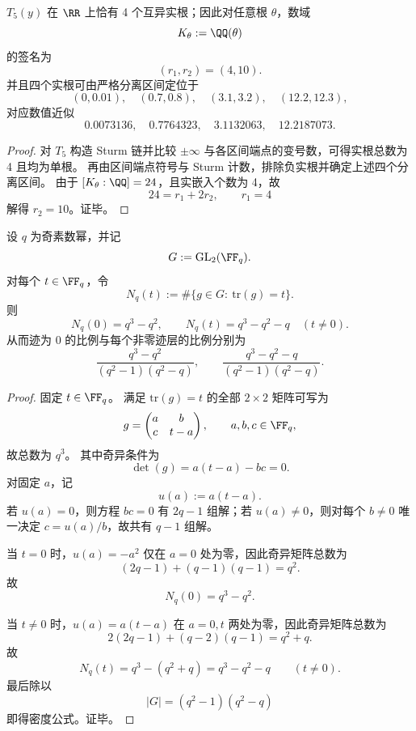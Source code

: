 \begin{proposition}[\(T_5\) 的实根结构与生成域签名]\label{prop:conclusion-elliptic-t5-real-root-signature}
\(T_5(y)\) 在 \(\RR\) 上恰有 4 个互异实根；因此对任意根 \(\theta\)，数域
\[
K_\theta:=\QQ(\theta)
\]
的签名为
\[
(r_1,r_2)=(4,10).
\]
并且四个实根可由严格分离区间定位于
\[
(0,0.01),\quad (0.7,0.8),\quad (3.1,3.2),\quad (12.2,12.3),
\]
对应数值近似
\[
0.0073136,\quad 0.7764323,\quad 3.1132063,\quad 12.2187073.
\]
\end{proposition}
\begin{proof}
对 \(T_5\) 构造 Sturm 链并比较 \(\pm\infty\) 与各区间端点的变号数，可得实根总数为 4 且均为单根。
再由区间端点符号与 Sturm 计数，排除负实根并确定上述四个分离区间。
由于 \([K_\theta:\QQ]=24\)，且实嵌入个数为 4，故
\[
24=r_1+2r_2,\qquad r_1=4
\]
解得 \(r_2=10\)。证毕。
\end{proof}

\begin{theorem}\label{thm:conclusion-gl2fq-trace-strata-count}
设 \(q\) 为奇素数幂，并记
\[
G:=\mathrm{GL}_2(\FF_q).
\]
对每个 \(t\in\FF_q\)，令
\[
N_q(t):=\#\{g\in G:\ \mathrm{tr}(g)=t\}.
\]
则
\[
N_q(0)=q^3-q^2,
\qquad
N_q(t)=q^3-q^2-q\quad(t\neq 0).
\]
从而迹为 \(0\) 的比例与每个非零迹层的比例分别为
\[
\frac{q^3-q^2}{(q^2-1)(q^2-q)},
\qquad
\frac{q^3-q^2-q}{(q^2-1)(q^2-q)}.
\]
\end{theorem}
\begin{proof}
固定 \(t\in\FF_q\)。
满足 \(\mathrm{tr}(g)=t\) 的全部 \(2\times 2\) 矩阵可写为
\[
g=
\begin{pmatrix}
a & b\\
c & t-a
\end{pmatrix},
\qquad
a,b,c\in\FF_q,
\]
故总数为 \(q^3\)。
其中奇异条件为
\[
\det(g)=a(t-a)-bc=0.
\]
对固定 \(a\)，记
\[
u(a):=a(t-a).
\]
若 \(u(a)=0\)，则方程 \(bc=0\) 有 \(2q-1\) 组解；若 \(u(a)\neq 0\)，则对每个 \(b\neq 0\) 唯一决定 \(c=u(a)/b\)，故共有 \(q-1\) 组解。

当 \(t=0\) 时，\(u(a)=-a^2\) 仅在 \(a=0\) 处为零，因此奇异矩阵总数为
\[
(2q-1)+(q-1)(q-1)=q^2.
\]
故
\[
N_q(0)=q^3-q^2.
\]

当 \(t\neq 0\) 时，\(u(a)=a(t-a)\) 在 \(a=0,t\) 两处为零，因此奇异矩阵总数为
\[
2(2q-1)+(q-2)(q-1)=q^2+q.
\]
故
\[
N_q(t)=q^3-(q^2+q)=q^3-q^2-q
\qquad (t\neq 0).
\]
最后除以
\[
|G|=(q^2-1)(q^2-q)
\]
即得密度公式。证毕。
\end{proof}

